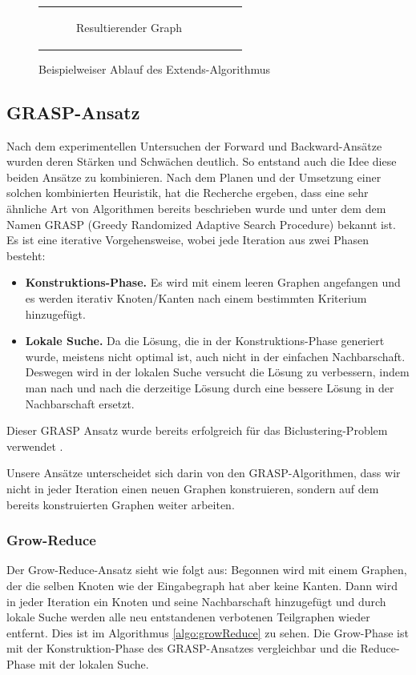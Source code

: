\documentclass[12pt,a4paper,onecolumn,oneside,titlepage]{article}
\begin{document}
\begin{figure}
\begin{tabular}[c]{ccc}
\begin{subfigure}[b]{0.32\textwidth}
      \caption{Resultierender Graph}
      \label{fig:algo:extend:6}
    \end{subfigure}
  \end{tabular}
  \caption{Beispielweiser Ablauf des Extends-Algorithmus}\label{fig:algo:extend}
\end{figure}

\subsection{GRASP-Ansatz}
Nach dem experimentellen Untersuchen der Forward und Backward-Ansätze wurden deren Stärken und Schwächen deutlich. So entstand auch die Idee diese beiden Ansätze zu kombinieren. Nach dem Planen und der Umsetzung einer solchen kombinierten Heuristik, hat die Recherche ergeben, dass eine sehr ähnliche Art von Algorithmen bereits beschrieben wurde und unter dem dem Namen GRASP (Greedy Randomized Adaptive Search Procedure) \cite{Feo95,Bastos2014} bekannt ist. Es ist eine iterative Vorgehensweise, wobei jede Iteration aus zwei Phasen besteht: 
\begin{itemize}
\item \textbf{Konstruktions-Phase.} Es wird mit einem leeren Graphen angefangen und es werden iterativ  Knoten/Kanten nach einem bestimmten Kriterium hinzugefügt.
\item \textbf{Lokale Suche.} Da die Lösung, die in der Konstruktions-Phase generiert wurde, meistens nicht optimal ist, auch nicht in der einfachen Nachbarschaft. Deswegen wird in der lokalen Suche versucht die Lösung zu verbessern, indem man nach und nach die derzeitige Lösung durch eine bessere Lösung in der Nachbarschaft ersetzt.
\end{itemize}
Dieser GRASP Ansatz wurde bereits erfolgreich für das Biclustering-Problem verwendet \cite{De12}.

Unsere Ansätze unterscheidet sich darin von den GRASP-Algorithmen, dass wir nicht in jeder Iteration einen neuen Graphen konstruieren, sondern auf dem bereits konstruierten Graphen weiter arbeiten. 

\subsubsection{Grow-Reduce}
Der Grow-Reduce-Ansatz sieht wie folgt aus: Begonnen wird mit einem Graphen, der die selben Knoten wie der Eingabegraph hat aber keine Kanten. Dann wird in jeder Iteration ein Knoten und seine Nachbarschaft hinzugefügt und durch lokale Suche werden alle neu entstandenen verbotenen Teilgraphen wieder entfernt. Dies ist im Algorithmus \ref{algo:growReduce} zu sehen.  Die Grow-Phase ist mit der Konstruktion-Phase des GRASP-Ansatzes vergleichbar und die Reduce-Phase mit der lokalen Suche.
\end{document}
